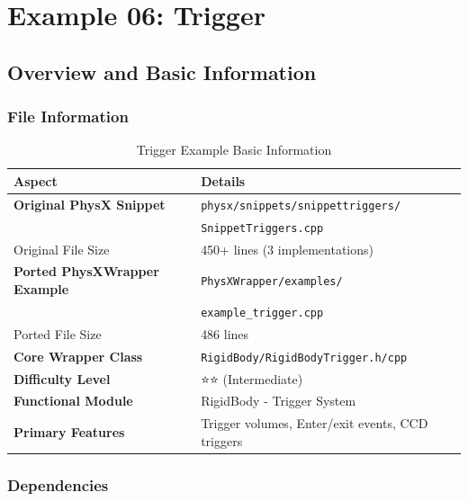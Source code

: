 
\section{Example 06: Trigger}

\subsection{Overview and Basic Information}

\subsubsection{File Information}

\begin{table}[h]
\centering
\begin{tabular}{|l|l|}
\hline
\textbf{Aspect} & \textbf{Details} \\
\hline
\textbf{Original PhysX Snippet} & \texttt{physx/snippets/snippettriggers/} \\
 & \texttt{SnippetTriggers.cpp} \\
\hline
Original File Size & 450+ lines (3 implementations) \\
\hline
\textbf{Ported PhysXWrapper Example} & \texttt{PhysXWrapper/examples/} \\
 & \texttt{example\_trigger.cpp} \\
\hline
Ported File Size & 486 lines \\
\hline
\textbf{Core Wrapper Class} & \texttt{RigidBody/RigidBodyTrigger.h/cpp} \\
\hline
\textbf{Difficulty Level} & ⭐⭐ (Intermediate) \\
\hline
\textbf{Functional Module} & RigidBody - Trigger System \\
\hline
\textbf{Primary Features} & Trigger volumes, Enter/exit events, CCD triggers \\
\hline
\end{tabular}
\caption{Trigger Example Basic Information}
\end{table}

\subsubsection{Dependencies}

